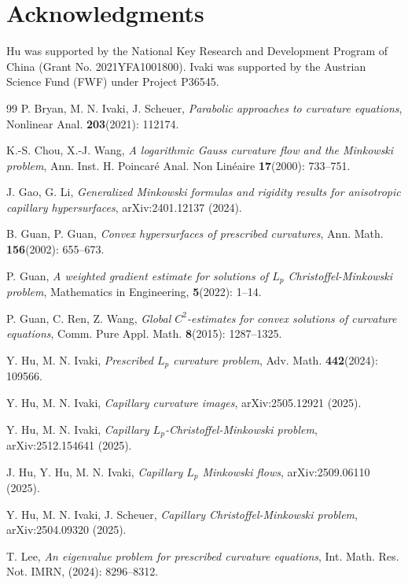 \documentclass[12pt]{amsart}
\numberwithin{equation}{section}
\newcommand{\8}{\infty}
\begin{document}
\section*{Acknowledgments}
Hu was supported by the National Key Research and Development Program of China (Grant No. 2021YFA1001800). Ivaki was supported by the Austrian Science Fund (FWF) under Project P36545.

\begin{thebibliography}{99}
 P. Bryan, M. N. Ivaki, J. Scheuer, \textit{Parabolic approaches to curvature equations}, Nonlinear Anal. \textbf{203}(2021): 112174.

 K.-S. Chou, X.-J. Wang, \textit{A logarithmic Gauss curvature flow and the Minkowski problem}, Ann. Inst. H. Poincar\'e Anal. Non Lin\'eaire \textbf{17}(2000): 733--751.

 J. Gao, G. Li, \textit{Generalized Minkowski formulas and rigidity results for anisotropic capillary hypersurfaces}, arXiv:2401.12137 (2024). 

 B. Guan, P. Guan, \textit{Convex hypersurfaces of prescribed curvatures}, Ann. Math. \textbf{156}(2002): 655--673.

 P. Guan, \textit{A weighted gradient estimate for solutions of $L_p$ Christoffel-Minkowski problem}, Mathematics in Engineering, \textbf{5}(2022): 1--14.

 P. Guan, C. Ren, Z. Wang, \textit{Global $C^2$-estimates for convex solutions of curvature equations}, Comm. Pure Appl. Math. \textbf{8}(2015): 1287--1325.

 Y. Hu, M. N. Ivaki, \textit{Prescribed $L_p$ curvature problem}, Adv. Math. \textbf{442}(2024): 109566.

Y. Hu, M. N. Ivaki, \textit{Capillary curvature images}, arXiv:2505.12921 (2025).

Y. Hu, M. N. Ivaki, \textit{Capillary $L_p$-Christoffel-Minkowski problem}, arXiv:2512.154641 (2025).

J. Hu, Y. Hu, M. N. Ivaki, \textit{Capillary $L_p$ Minkowski flows}, arXiv:2509.06110 (2025).

Y. Hu, M. N. Ivaki, J. Scheuer, \textit{Capillary Christoffel-Minkowski problem}, arXiv:2504.09320 (2025).

 T. Lee, \textit{An eigenvalue problem for prescribed curvature equations}, Int. Math. Res. Not. IMRN, (2024): 8296--8312.


\end{thebibliography}
\end{document}
